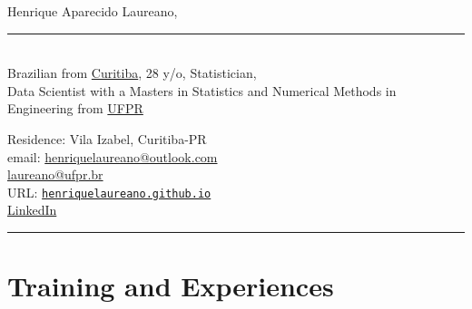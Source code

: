 \documentclass[12pt]{article}
\newcommand{\horrule}[1]{\noindent\rule{\linewidth}{#1}}
\begin{document}
\noindent
\begin{minipage}[t]{.565\textwidth}
 \raggedright
 \large Henrique Aparecido Laureano,
 \noindent\rule{.89\linewidth}{1pt}\\
 \normalsize Brazilian from
 \href{https://goo.gl/K1Qcdv}{\color{blue}Curitiba}, 28 y/o,
 Statistician,\\Data Scientist with a Masters in Statistics and
 Numerical Methods in Engineering from 
 \href{https://goo.gl/DtVAbi}{\color{blue}UFPR}
\end{minipage}%
\begin{minipage}[t]{.435\textwidth}
 \raggedright
 Residence: Vila Izabel, Curitiba-PR\\
 email:
 \href{mailto:henriquelaureano@outlook.com}{\color{blue}
   henriquelaureano@outlook.com}\\
 \hspace{1.2cm}
 \href{mailto:laureano@ufpr.br}{\color{blue}laureano@ufpr.br}\\
 URL:
 \href{https://henriquelaureano.github.io/}{
  \color{blue}\texttt{henriquelaureano.github.io}}\\
 \href{https://www.linkedin.com/in/henrique-laureano-025328179}{
  \color{blue}LinkedIn}
\end{minipage}

\vspace{0.5cm}
\horrule{1pt}

\vspace{-0.25cm}
\section*{Training and Experiences}
\end{document}
